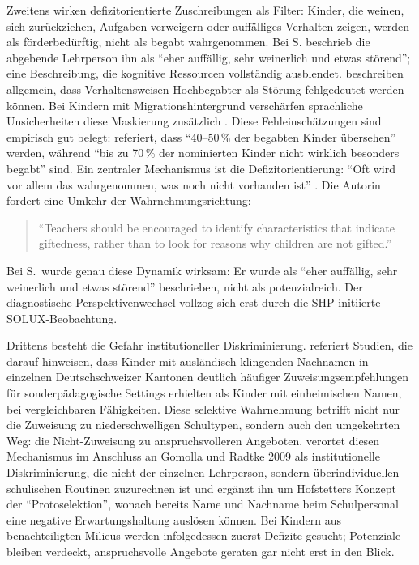 \documentclass[ngerman, a4paper]{article}
\begin{document}
Zweitens wirken defizitorientierte Zuschreibungen als Filter: Kinder, die weinen,
sich zurückziehen, Aufgaben verweigern oder auffälliges Verhalten zeigen, werden
als förderbedürftig, nicht als begabt wahrgenommen. Bei S. beschrieb die abgebende
Lehrperson ihn als \enquote{eher auffällig, sehr weinerlich und etwas störend}; eine
Beschreibung, die kognitive Ressourcen vollständig ausblendet.
\textcite[S.\,87--94]{webb2020doppeldiagnosen} beschreiben allgemein, dass
Verhaltensweisen Hochbegabter als Störung fehlgedeutet werden können. Bei
Kindern mit Migrationshintergrund verschärfen sprachliche Unsicherheiten diese
Maskierung zusätzlich \parencite[S.\,576--587]{stamm2021fehlenderblick}.
Diese Fehleinschätzungen sind empirisch gut belegt:
\textcite[S.\,229]{muelleroppliger2021paeddiagnostik} referiert, dass
\enquote{40--50\,\% der begabten Kinder übersehen} werden, während
\enquote{bis zu 70\,\% der nominierten Kinder nicht wirklich besonders
begabt} sind. Ein zentraler Mechanismus ist die Defizitorientierung:
\enquote{Oft wird vor allem das wahrgenommen, was noch nicht vorhanden
ist} \parencite[S.\,229]{muelleroppliger2021paeddiagnostik}. Die Autorin
fordert eine Umkehr der Wahrnehmungsrichtung:
\begin{quote}
\foreignlanguage{english}{\enquote{Teachers \textelp{} should be
encouraged to identify characteristics that indicate giftedness, rather
than to look for reasons why children are not gifted.}}
\parencite[S.\,228]{muelleroppliger2021paeddiagnostik}
\end{quote}
Bei S.\ wurde genau diese Dynamik wirksam: Er wurde als \enquote{eher
auffällig, sehr weinerlich und etwas störend} beschrieben, nicht als
potenzialreich. Der diagnostische Perspektivenwechsel vollzog sich erst
durch die SHP-initiierte SOLUX-Beobachtung.

Drittens besteht die Gefahr institutioneller Diskriminierung.
\textcite[S.\,63--77]{kappus2010migration} referiert Studien, die darauf
hinweisen, dass Kinder mit ausländisch klingenden Nachnamen in einzelnen
Deutschschweizer Kantonen deutlich häufiger Zuweisungsempfehlungen für
sonderpädagogische Settings erhielten als Kinder mit einheimischen Namen,
bei vergleichbaren Fähigkeiten. Diese selektive Wahrnehmung betrifft
nicht nur die Zuweisung zu niederschwelligen Schultypen, sondern auch den
umgekehrten Weg: die Nicht-Zuweisung zu anspruchsvolleren Angeboten.
\textcite[S.\,58--59]{stamm2025vonuntennachoben} verortet diesen
Mechanismus im Anschluss an Gomolla und Radtke 2009 als institutionelle
Diskriminierung, die nicht der einzelnen Lehrperson, sondern
überindividuellen schulischen Routinen zuzurechnen ist und ergänzt ihn
um Hofstetters Konzept der \enquote{Protoselektion}, wonach bereits Name
und Nachname beim Schulpersonal eine negative Erwartungshaltung auslösen
können. Bei Kindern aus benachteiligten Milieus werden infolgedessen
zuerst Defizite gesucht; Potenziale bleiben verdeckt, anspruchsvolle
Angebote geraten gar nicht erst in den Blick.
\end{document}
